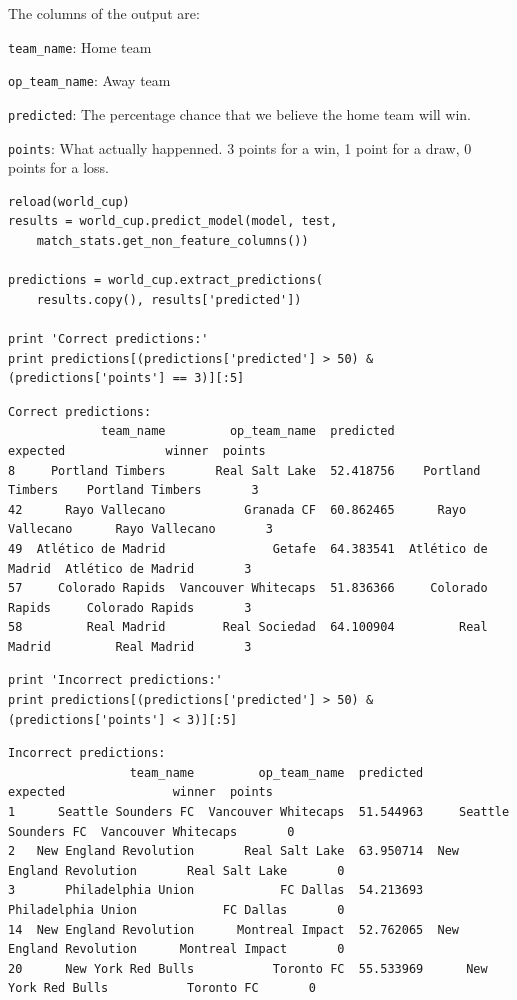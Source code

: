 \documentclass[12pt,fleqn]{article}\usepackage{common}
\begin{document}
The columns of the output are:

\verb!team_name!: Home team

\verb!op_team_name!: Away team

\verb!predicted!: The percentage chance that we believe the home team will win.

\verb!points!: What actually happenned. 3 points for a win, 1 point for a draw, 0
points for a loss. 

\begin{verbatim}
reload(world_cup)
results = world_cup.predict_model(model, test, 
    match_stats.get_non_feature_columns())

predictions = world_cup.extract_predictions(
    results.copy(), results['predicted'])

print 'Correct predictions:'
print predictions[(predictions['predicted'] > 50) & (predictions['points'] == 3)][:5]
\end{verbatim}

\begin{verbatim}
Correct predictions:
             team_name         op_team_name  predicted            expected              winner  points
8     Portland Timbers       Real Salt Lake  52.418756    Portland Timbers    Portland Timbers       3
42      Rayo Vallecano           Granada CF  60.862465      Rayo Vallecano      Rayo Vallecano       3
49  Atlético de Madrid               Getafe  64.383541  Atlético de Madrid  Atlético de Madrid       3
57     Colorado Rapids  Vancouver Whitecaps  51.836366     Colorado Rapids     Colorado Rapids       3
58         Real Madrid        Real Sociedad  64.100904         Real Madrid         Real Madrid       3
\end{verbatim}

\begin{verbatim}
print 'Incorrect predictions:'
print predictions[(predictions['predicted'] > 50) & (predictions['points'] < 3)][:5]
\end{verbatim}

\begin{verbatim}
Incorrect predictions:
                 team_name         op_team_name  predicted                expected               winner  points
1      Seattle Sounders FC  Vancouver Whitecaps  51.544963     Seattle Sounders FC  Vancouver Whitecaps       0
2   New England Revolution       Real Salt Lake  63.950714  New England Revolution       Real Salt Lake       0
3       Philadelphia Union            FC Dallas  54.213693      Philadelphia Union            FC Dallas       0
14  New England Revolution      Montreal Impact  52.762065  New England Revolution      Montreal Impact       0
20      New York Red Bulls           Toronto FC  55.533969      New York Red Bulls           Toronto FC       0
\end{verbatim}
\end{document}
